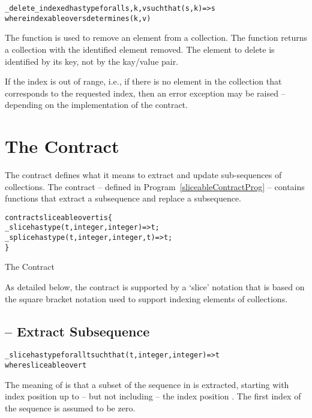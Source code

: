 \begin{alltt}
\_delete\_indexed has type for all s,k,v such that (s,k)=>s
                           where indexable over s determines (k,v)
\end{alltt}
The  function is used to remove an element from a collection. The  function returns a collection with the identified element removed. The element to delete is identified by its key, not by the kay/value pair.

\begin{aside}
If the index is out of range, i.e., if there is no element in the collection that corresponds to the requested index, then an error exception may be raised -- depending on the implementation of the contract.
\end{aside}

\section{The  Contract}
\label{sliceableContract}
The  contract defines what it means to extract and update sub-sequences of collections. The contract -- defined in Program~\vref{sliceableContractProg} -- contains functions that extract a subsequence and replace a subsequence.
\begin{program}[htb]
\begin{alltt}
contract sliceable over t is \{
  \_slice has type (t,integer,integer)=>t;
  \_splice has type (t,integer,integer,t)=>t;
\}
\end{alltt}
\caption{The  Contract\label{sliceableContractProg}}
\end{program}
As detailed below, the  contract is supported by a `slice' notation that is based on the square bracket notation used to support indexing elements of collections.

\subsection{ -- Extract Subsequence}
\label{sliceFunction}
\begin{alltt}
\_slice has type for all t such that (t,integer,integer)=>t
                 where sliceable over t
\end{alltt}
The meaning of  is that a subset of the sequence in  is extracted, starting with index position  up to -- but not including -- the index position . The first index of the sequence is assumed to be zero.

